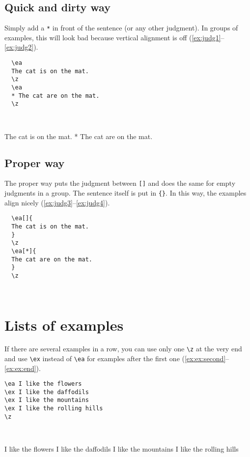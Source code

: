 \documentclass[output=paper]{langscibook}
\newcommand{\cmd}[1]{\texttt{\textbackslash#1}}
\begin{document}
\subsection{Quick and dirty way}
Simply add a \texttt{*} in front of the sentence (or any other judgment). In groups of examples, this will look bad because vertical alignment is off (\ref{ex:judg1}--\ref{ex:judg2}).

\begin{minipage}[t]{.45\textwidth}
\begin{lstlisting}
  \ea
  The cat is on the mat.
  \z
  \ea
  * The cat are on the mat.
  \z
\end{lstlisting}
\end{minipage}~
\parbox[t]{.45\textwidth}{
  \ea\label{ex:judg1}
  The cat is on the mat.
  \z
  \ea\label{ex:judg2}
  * The cat are on the mat.
  \z
  }

\subsection{Proper way}
The proper way puts the judgment between \texttt{[]} and does the same for empty judgments in a group. The sentence itself is put in \texttt{\{\}}. In this way, the examples align nicely (\ref{ex:judg3}--\ref{ex:judg4}).

\begin{minipage}[t]{.45\textwidth}
\begin{lstlisting}
  \ea[]{
  The cat is on the mat.
  }
  \z
  \ea[*]{
  The cat are on the mat.
  }
  \z
\end{lstlisting}
\end{minipage}~
\parbox[t]{.45\textwidth}{
  \z
  \z
  }


\section{Lists of examples}
If there are several examples in a row, you can use only one \cmd{z} at the very end and use \cmd{ex} instead of \cmd{ea} for examples after the first one (\ref{ex:ex:second}--\ref{ex:ex:end}).

\begin{minipage}{.45\textwidth}
\begin{lstlisting}
\ea I like the flowers
\ex I like the daffodils
\ex I like the mountains
\ex I like the rolling hills
\z
\end{lstlisting}
\end{minipage}~
\parbox{.45\textwidth}{
\ea I like the flowers\label{ex:ex:start}
\ex I like the daffodils\label{ex:ex:second}
\ex I like the mountains
\ex I like the rolling hills\label{ex:ex:end}
\z
}
\end{document}
